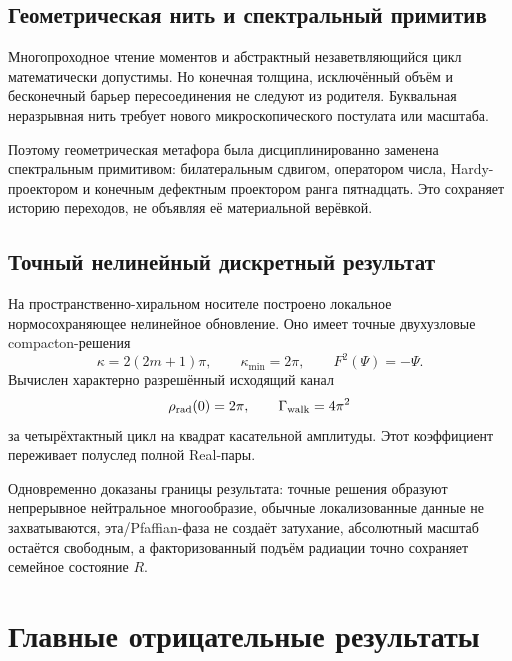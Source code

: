 \subsection{Геометрическая нить и спектральный примитив}

Многопроходное чтение моментов и абстрактный незаветвляющийся цикл
математически допустимы. Но конечная толщина, исключённый объём и
бесконечный барьер пересоединения не следуют из родителя. Буквальная
неразрывная нить требует нового микроскопического постулата или масштаба.

Поэтому геометрическая метафора была дисциплинированно заменена
спектральным примитивом: билатеральным сдвигом, оператором числа,
Hardy-проектором и конечным дефектным проектором ранга пятнадцать. Это
сохраняет историю переходов, не объявляя её материальной верёвкой.

\subsection{Точный нелинейный дискретный результат}

На пространственно-хиральном носителе построено локальное
нормосохраняющее нелинейное обновление. Оно имеет точные двухузловые
compacton-решения
\begin{equation}
 \kappa=2(2m+1)\pi,
 \qquad
 \kappa_{\min}=2\pi,
 \qquad
 F^2(\Psi)=-\Psi.
\end{equation}
Вычислен характерно разрешённый исходящий канал
\begin{equation}
 \rho_{\rm rad}(0)=2\pi,
 \qquad
 \Gamma_{\rm walk}=4\pi^2
\end{equation}
за четырёхтактный цикл на квадрат касательной амплитуды. Этот коэффициент
переживает полуслед полной Real-пары.

Одновременно доказаны границы результата: точные решения образуют
непрерывное нейтральное многообразие, обычные локализованные данные не
захватываются, эта/Pfaffian-фаза не создаёт затухание, абсолютный масштаб
остаётся свободным, а факторизованный подъём радиации точно сохраняет
семейное состояние $R$.

\section{Главные отрицательные результаты}


